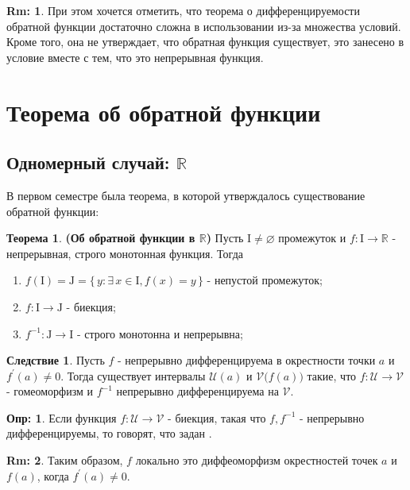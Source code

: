\documentclass[12pt]{article}
\newcommand{\MR}{\mathbb{R}}
\newcommand{\MI}{\mathrm{I}}
\newcommand{\MJ}{\mathrm{J}}
\newcommand{\MU}{\mathcal{U}}
\newcommand{\MV}{\mathcal{V}}
\newcommand{\VN}{\varnothing}
\theoremstyle{definition}
\newtheorem{defn}{Опр:}
\newtheorem{rem}{Rm:}
\newtheorem{theorem}{Теорема}
\newtheorem{corollary}{Следствие}
\begin{document}
\begin{rem}
	При этом хочется отметить, что теорема о дифференцируемости обратной функции достаточно сложна в использовании из-за множества условий. Кроме того, она не утверждает, что обратная функция существует, это занесено в условие вместе с тем, что это непрерывная функция.
\end{rem}

\newpage
\section*{Теорема об обратной функции}
\subsection*{Одномерный случай: $\MR$}
В первом семестре была теорема, в которой утверждалось существование обратной функции:
\begin{theorem}\textbf{(Об обратной функции в $\MR$)}
	Пусть $\MI \neq \VN$ промежуток и $f \colon \MI \to \MR$ - непрерывная, строго монотонная функция. Тогда 
	\begin{enumerate}[label={\arabic*)}]
		\item $f(\MI) = \MJ = \{\, y \colon \exists \, x \in \MI, f(x) = y \,\}$ - непустой промежуток;
		\item $f\colon \MI \to \MJ$ - биекция;
		\item $f^{-1} \colon \MJ \to \MI$ - строго монотонна и непрерывна;
	\end{enumerate}
\end{theorem}

\begin{corollary}
	Пусть $f$ - непрерывно дифференцируема в окрестности точки $a$ и $f^\prime(a) \neq 0$. Тогда существует интервалы $\MU(a)$ и $\MV\big(f(a)\big)$ такие, что $f\colon \MU \to \MV$ - гомеоморфизм и $f^{-1}$ непрерывно дифференцируема на $\MV$.
\end{corollary}
\begin{defn}
	Если функция $f\colon \MU \to \MV$ - биекция, такая что $f, f^{-1}$ - непрерывно дифференцируемы, то говорят, что задан .
\end{defn}

\begin{rem}
	Таким образом, $f$ локально это диффеоморфизм окрестностей точек $a$ и $f(a)$, когда $f^\prime(a) \neq 0$.
\end{rem}
\end{document}
